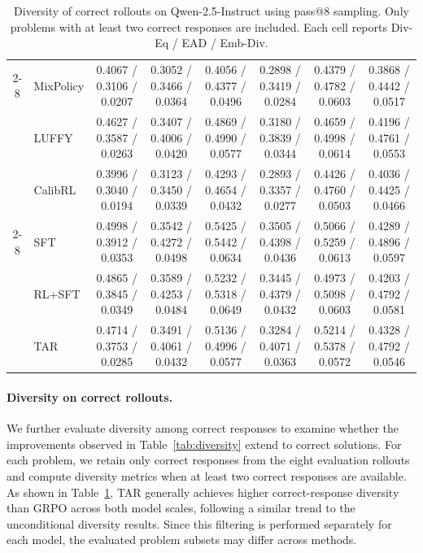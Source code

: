 \documentclass[11pt]{article}
\newcommand{\model}{\textsc{TAR}\xspace}
\begin{document}
\begin{table}[t]
{\begin{tabular}{clcccccc}
\cmidrule(lr){2-8}

& MixPolicy
& 0.4067 / 0.3106 / 0.0207
& 0.3052 / 0.3466 / 0.0364
& 0.4056 / 0.4377 / 0.0496
& 0.2898 / 0.3419 / 0.0284
& 0.4379 / 0.4782 / 0.0603
& 0.3868 / 0.4442 / 0.0517
\\

& LUFFY
& 0.4627 / 0.3587 / 0.0263
& 0.3407 / 0.4006 / 0.0420
& 0.4869 / 0.4990 / 0.0577
& 0.3180 / 0.3839 / 0.0344
& 0.4659 / 0.4998 / 0.0614
& 0.4196 / 0.4761 / 0.0553
\\

& CalibRL
& 0.3996 / 0.3040 / 0.0194
& 0.3123 / 0.3450 / 0.0339
& 0.4293 / 0.4654 / 0.0432
& 0.2893 / 0.3357 / 0.0277
& 0.4426 / 0.4760 / 0.0503
& 0.4036 / 0.4425 / 0.0466
\\

\cmidrule(lr){2-8}

& SFT
& 0.4998 / 0.3912 / 0.0353
& 0.3542 / 0.4272 / 0.0498
& 0.5425 / 0.5442 / 0.0634
& 0.3505 / 0.4398 / 0.0436
& 0.5066 / 0.5259 / 0.0613
& 0.4289 / 0.4896 / 0.0597
\\

& RL+SFT
& 0.4865 / 0.3845 / 0.0349
& 0.3589 / 0.4253 / 0.0484
& 0.5232 / 0.5318 / 0.0649
& 0.3445 / 0.4379 / 0.0432
& 0.4973 / 0.5098 / 0.0603
& 0.4203 / 0.4792 / 0.0581
\\

& \model
& 0.4714 / 0.3753 / 0.0285
& 0.3491 / 0.4061 / 0.0432
& 0.5136 / 0.4996 / 0.0577
& 0.3284 / 0.4071 / 0.0363
& 0.5214 / 0.5378 / 0.0572
& 0.4328 / 0.4792 / 0.0546
\\

\bottomrule
\end{tabular}%
}
\caption{
Diversity of correct rollouts on Qwen-2.5-Instruct using pass@8 sampling.
Only problems with at least two correct responses are included.
Each cell reports Div-Eq / EAD / Emb-Div.
}
\label{tab:correct-diversity}

\end{table}


\paragraph{Diversity on correct rollouts.} We further evaluate diversity among correct responses to examine whether the improvements observed in
Table~\ref{tab:diversity} extend to correct solutions. For each problem, we retain only correct responses
from the eight evaluation rollouts and compute diversity metrics when at least two correct responses
are available.
As shown in Table~\ref{tab:correct-diversity}, \model generally achieves higher correct-response diversity than GRPO across both model scales, following a similar trend to the unconditional diversity results. Since this filtering is performed separately for each model, the evaluated problem subsets may differ across methods.
\end{document}
